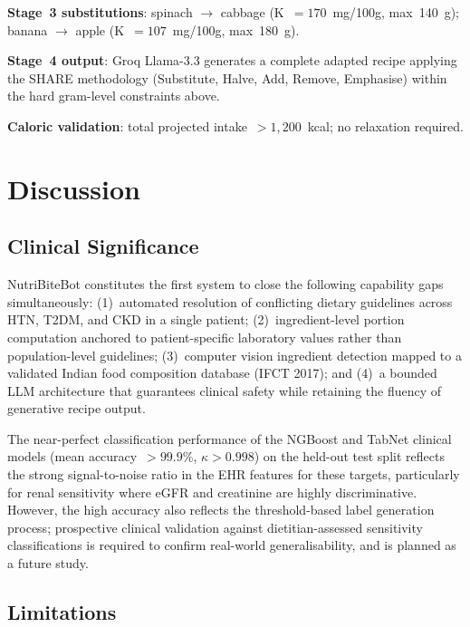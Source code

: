 \documentclass[journal]{IEEEtran}
\begin{document}
\textbf{Stage~3 substitutions}: spinach $\rightarrow$ cabbage
(K~$= 170$~mg/100g, max~140~g); banana $\rightarrow$ apple
(K~$= 107$~mg/100g, max~180~g).

\textbf{Stage~4 output}: Groq Llama-3.3 generates a complete adapted
recipe applying the SHARE methodology (Substitute, Halve, Add, Remove,
Emphasise) within the hard gram-level constraints above.

\textbf{Caloric validation}: total projected intake~$> 1{,}200$~kcal;
no relaxation required.

\section{Discussion}
\label{sec:discussion}

\subsection{Clinical Significance}

NutriBiteBot constitutes the first system to close the following
capability gaps simultaneously: (1)~automated resolution of conflicting
dietary guidelines across HTN, T2DM, and CKD in a single patient;
(2)~ingredient-level portion computation anchored to patient-specific
laboratory values rather than population-level guidelines; (3)~computer
vision ingredient detection mapped to a validated Indian food
composition database (IFCT 2017); and (4)~a bounded LLM architecture
that guarantees clinical safety while retaining the fluency of
generative recipe output.

The near-perfect classification performance of the NGBoost and TabNet
clinical models (mean accuracy~$> 99.9\%$, $\kappa > 0.998$) on the
held-out test split reflects the strong signal-to-noise ratio in the
EHR features for these targets, particularly for renal sensitivity
where eGFR and creatinine are highly discriminative. However, the
high accuracy also reflects the threshold-based label generation
process; prospective clinical validation against dietitian-assessed
sensitivity classifications is required to confirm real-world
generalisability, and is planned as a future study.

\subsection{Limitations}
\end{document}
